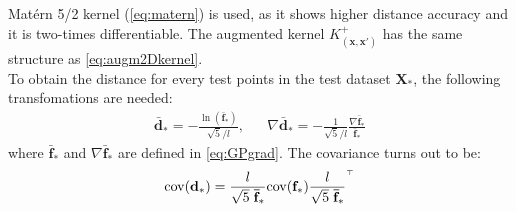 \documentclass[10pt,a4paper,twocolumn]{article}
\newcommand{\trsp}{{\scriptscriptstyle\top}}
\newcommand{\cov}{\mathrm{cov}}
\begin{document}
Matérn 5/2 kernel (\autoref{eq:matern}) is used, as it shows higher distance accuracy and it is two-times differentiable. The augmented kernel $K^+_{(\mathbf{x}, \mathbf{x'})}$ has the same structure as \autoref{eq:augm2Dkernel}.\\
To obtain the distance for every test points in the test dataset $\mathbf{X_*}$, the following transfomations are needed:
\begin{equation}
	\begin{aligned}
		\mathbf{\bar{d}_*} = -\frac{\ln(\mathbf{\bar{f}_*})}{\sqrt{5}/l}, &&
		\nabla \mathbf{\bar{d}_*} = - \frac{1}{\sqrt{5}/l} \frac{\nabla \mathbf{\bar{f}_*}}{\mathbf{\bar{f}_*}}
	\end{aligned}
\end{equation}
where $\mathbf{\bar{f}_*}$ and $\nabla \mathbf{\bar{f}_*}$ are defined in \autoref{eq:GPgrad}.
The covariance turns out to be:
\begin{equation}
	\cov(\mathbf{d}_*) = \frac{l}{\sqrt{5} \hspace{1mm} \mathbf{\bar{f}_*}} \cov(\mathbf{f}_*) \frac{l}{\sqrt{5} \hspace{1mm} \mathbf{\bar{f}_*}}^\trsp
\end{equation}



\end{document}
